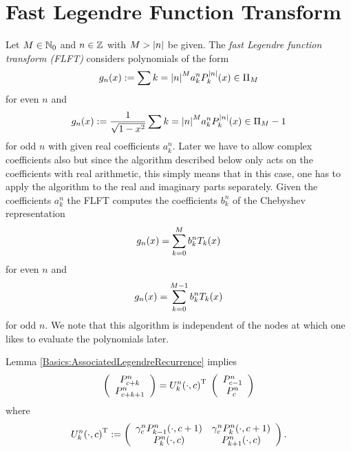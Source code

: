 \section{Fast Legendre Function Transform}
\label{DSFT:FLFT}

Let $M \in \mathbb{N}_{0}$ and $n \in \mathbb{Z}$ with $M > \left\vert n\right\vert$ be given. The  \emph{fast Legendre function transform (FLFT)}
considers polynomials of the form
$$ g_n{\hspace{-0.4ex}}\left(x\right) := \sum{k=\ensuremath{\left\vert n\right\vert}}^M a_k^n P_k^{\left\vert n\right\vert}{\hspace{-0.4ex}}\left(x\right) \in \Pi_M$$
for even $n$ and
$$ g_n{\hspace{-0.4ex}}\left(x\right) := \frac{1}{\sqrt{1-x^2}} \sum{k=\ensuremath{\left\vert n\right\vert}}^M a_k^n P_k^{\left\vert n\right\vert}{\hspace{-0.4ex}}\left(x\right) \in \Pi_M-1$$
for odd $n$ with given real coefficients $a_k^n$. Later we have to allow complex coefficients also but since 
the algorithm described below only acts on the coefficients with real arithmetic, this simply means that in this 
case, one has to apply the algorithm to the real and imaginary parts separately.
Given the coefficients $a_k^n$ the FLFT computes the coefficients $b_k^n$ of the Chebyshev representation
$$ g_n{\hspace{-0.4ex}}\left(x\right) = \sum_{k=0}^M b_k^n T_k{\hspace{-0.4ex}}\left(x\right)$$
for even $n$ and
$$g_n{\hspace{-0.4ex}}\left(x\right) = \sum_{k=0}^{M-1} b_k^n T_k{\hspace{-0.4ex}}\left(x\right)$$
for odd $n$. We note that this algorithm is independent of the nodes at which one likes to evaluate the polynomials later.

Lemma \ref{Basics:AssociatedLegendreRecurrence} implies
$$ 
  \left(\begin{array}{c}
    P_{c+k}^n \\ P_{c+k+1}^n
  \end{array}\right)
  =
  U_{k}^{n}{\hspace{-0.4ex}}\left(\cdot,c\right)^{\text{\rm{T}}}\;
  \left(\begin{array}{c}
    P_{c-1}^n \\ P_{c}^n
  \end{array}\right)
$$
where
$$
  U_{k}^{n}{\hspace{-0.4ex}}\left(\cdot,c\right)^{\text{\rm{T}}} :=
  \left(\begin{array}{cc}
    \gamma_c^n P_{k-1}^n{\hspace{-0.4ex}}\left(\cdot,c+1\right) & \gamma_c^n P_{k}^n{\hspace{-0.4ex}}\left(\cdot,c+1\right) \\
                             P_{k}^n{\hspace{-0.4ex}}\left(\cdot,c\right)         &                         P_{k+1}^n{\hspace{-0.4ex}}\left(\cdot,c\right)
  \end{array}\right).   
$$

